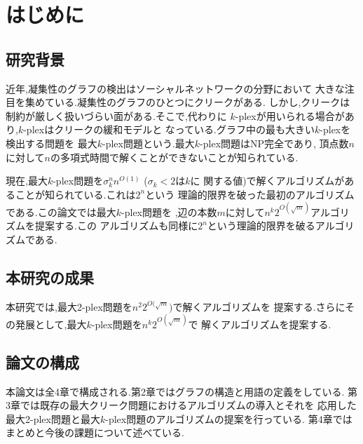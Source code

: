 \documentclass{thesis}
\theoremstyle{definition}
\begin{document}
\baselineskip=22pt
\pagestyle{empty}

\maketitle

\pagestyle{myheadings}	%
\tableofcontents

\newpage


\chapter{はじめに}

\section{研究背景}
近年,凝集性のグラフの検出はソーシャルネットワークの分野において
大きな注目を集めている.凝集性のグラフのひとつにクリークがある.
しかし,クリークは制約が厳しく扱いづらい面がある.そこで,代わりに
$k$-plexが用いられる場合があり,$k$-plexはクリークの緩和モデルと
なっている.グラフ中の最も大きい$k$-plexを検出する問題を
最大$k$-plex問題という.最大$k$-plex問題はNP完全であり,
頂点数$n$に対して$n$の多項式時間で解くことができないことが知られている.

現在,最大$k$-plex問題を$\sigma_{k}^{n}n^{O(1) }$ ($\sigma_{k} < 2$は$k$に
関する値)で解くアルゴリズムがあることが知られている.これは$2^{n}$という
理論的限界を破った最初のアルゴリズムである.この論文では最大$k$-plex問題を
,辺の本数$m$に対して$n^{k }2^{O(\sqrt{m})}$アルゴリズムを提案する.この
アルゴリズムも同様に$2^{n}$という理論的限界を破るアルゴリズムである.

\section{本研究の成果}
本研究では,最大2-plex問題を$n^{2}2^{O(\sqrt{m}})$で解くアルゴリズムを
提案する.さらにその発展として,最大$k$-plex問題を$n^{k }2^{O(\sqrt{m})}$で
解くアルゴリズムを提案する.

\section{論文の構成}
本論文は全4章で構成される.第2章ではグラフの構造と用語の定義をしている.
第3章では既存の最大クリーク問題におけるアルゴリズムの導入とそれを
応用した最大2-plex問題と最大$k$-plex問題のアルゴリズムの提案を行っている.
第4章ではまとめと今後の課題について述べている.
\end{document}

